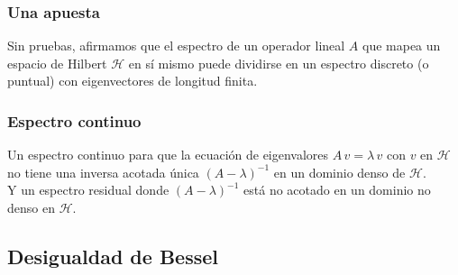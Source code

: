 \documentclass[12pt]{beamer}
\begin{document}
\begin{frame}
\frametitle{Una apuesta}
Sin pruebas, afirmamos que el espectro de un operador lineal $A$ que mapea un espacio de Hilbert $\mathcal{H}$ en sí mismo \pause puede dividirse en un espectro discreto (o puntual) con eigenvectores de longitud finita.
\end{frame}
\begin{frame}
\frametitle{Espectro continuo}
Un espectro continuo para que la ecuación de eigenvalores $A \, v = \lambda \, v$ con $v$ en $\mathcal{H}$ no tiene una inversa acotada única $(A - \lambda)^{-1}$ en un dominio denso de $\mathcal{H}$.
\\
\bigskip
\pause
Y un espectro residual donde $(A - \lambda)^{-1}$ está no acotado en un dominio no denso en $\mathcal{H}$.
\end{frame}

\subsection{Desigualdad de Bessel}
\end{document}
